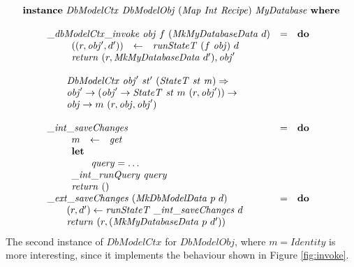\begin{displaymath}
\begin{array}{l}
\mathbf{instance}~\mathit{DbModelCtx}~\mathit{DbModelObj}~(\mathit{Map}~\mathit{Int}~\mathit{Recipe})~\mathit{MyDatabase}~\mathbf{where}\\\\
\qquad \begin{array}{lcl}
\mathit{\_\mathit{dbModelCtx\_invoke}} ~\mathit{obj}~f~(\mathit{MkMyDatabaseData}~d) & = & \mathbf{do}\\
\multicolumn{3}{l}{\qquad \begin{array}{lcl}
((r, \mathit{obj'}, d')) & \leftarrow & \mathit{runStateT}~(f~\mathit{obj})~d \\
\multicolumn{3}{l}{\mathit{return}~(r, \mathit{MkMyDatabaseData}~d'), \mathit{obj}'}
\end{array}}
\\\\
\multicolumn{3}{l}{\qquad \mathit{DbModelCtx}~\mathit{obj}'~\mathit{st}'~(\mathit{StateT}~\mathit{st}~\mathit{m}) \Rightarrow}\\
\multicolumn{3}{l}{\qquad \mathit{obj}' \to (\mathit{obj}' \to \mathit{StateT}~\mathit{st}~m~(r,\mathit{obj}')) \to} \\
\multicolumn{3}{l}{\qquad \mathit{obj} \to m~(r,\mathit{obj},\mathit{obj}')} \\\\
\mathit{\_int\_saveChanges} & = & \mathbf{do} \\
\multicolumn{3}{l}{\qquad \begin{array}{lcl}
    m & \leftarrow & \mathit{get} \\
    \multicolumn{3}{l}{\mathbf{let}} \\
    \multicolumn{3}{l}{\qquad \mathit{query} = \ldots} \\
    \multicolumn{3}{l}{\mathit{\_int\_runQuery}~\mathit{query}}\\
    \multicolumn{3}{l}{\mathit{return}~()}
\end{array} }\\
\mathit{\_ext\_saveChanges}~(\mathit{MkDbModelData}~p~d) & = & \mathbf{do} \\
\multicolumn{3}{l}{\qquad (r,d') \leftarrow \mathit{runStateT}~\mathit{\_int\_saveChanges}~d } \\ 
\multicolumn{3}{l}{\qquad \mathit{return}~(r, (\mathit{MkMyDatabaseData}~p~d')) } 
\end{array}
\end{array}
\end{displaymath}
The second instance of $\mathit{DbModelCtx}$ for $\mathit{DbModelObj}$, where $m = \mathit{Identity}$ is more interesting, since it implements the behaviour shown in Figure \ref{fig:invoke}.

